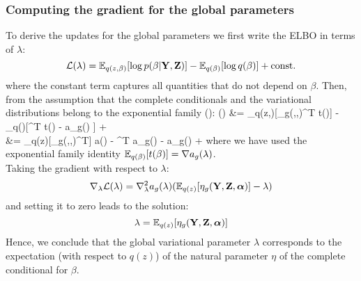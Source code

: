 \subsubsection{Computing the gradient for the global parameters}

To derive the updates for the global parameters we first write the ELBO in terms of $\lambda$:
\[
	\mathcal{L}(\lambda) = \mathbb{E}_{q(z,\beta)}[\log p(\beta|{\bf Y},{\bf Z})] - \mathbb{E}_{q(\beta)}[\log q(\beta)] + {\rm const.}
\]
where the constant term captures all quantities that do not depend on $\beta$. Then, from the assumption that the complete conditionals and the variational distributions belong to the exponential family ():
\baln
	\Lagr(\lambda) &= \E_{q(z,\beta)}[\eta_g(\bfY,\bfZ,\balpha)^T t(\beta)] - \E_{q(\beta)}[\lambda^T t(\beta) - a_g(\lambda) ] + \const \\
	&= \E_{q(z)}[\eta_g(\bfY,\bfZ,\balpha)^T] \nabla a(\lambda) - \lambda^T \nabla a_g(\lambda) - a_g(\lambda) + \const
\ealn
where we have used the exponential family identity $\mathbb{E}_{q(\beta)}[t(\beta)] = \nabla a_g(\lambda)$. \\
Taking the gradient with respect to $\lambda$:
\begin{equation} \label{gradient_global}
	\nabla_{\lambda} \mathcal{L}(\lambda) = \nabla_{\lambda}^{2} a_g(\lambda)(\mathbb{E}_{q(z)}[\eta_g({\bf Y},{\bf Z},\mbox{\boldmath $\alpha$})] - \lambda)
\end{equation}
and setting it to zero leads to the solution:
\begin{equation} \label{solution_global}
	\lambda = \mathbb{E}_{q(z)}[\eta_g({\bf Y},{\bf Z},\mbox{\boldmath $\alpha$})]
\end{equation}
Hence, we conclude that the global variational parameter $\lambda$ corresponds to the expectation (with respect to $q(z)$) of the natural parameter $\eta$ of the complete conditional for $\beta$.